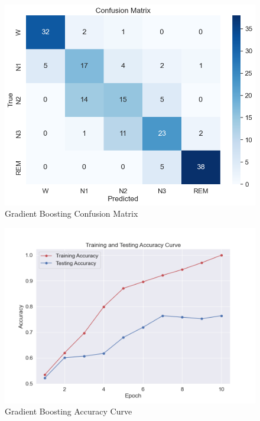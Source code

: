 \begin{figure}[H]
	\centering
	\includegraphics[width=\textwidth]{img/paper_1//confusion_matrix.png}
	\caption{Gradient Boosting Confusion Matrix}
\end{figure}

\begin{figure}[H]
	\centering
	\includegraphics[width=\textwidth]{img/paper_1//accuracy_curve.png}
	\caption{Gradient Boosting Accuracy Curve}
\end{figure}

